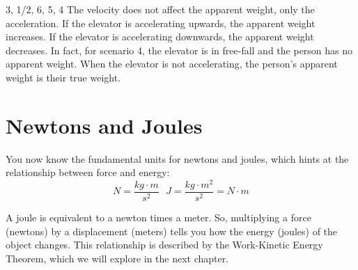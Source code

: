 \begin{Answer}[ref = elevator]
3, 1/2, 6, 5, 4
The velocity does not affect the apparent weight, only the acceleration. If the 
elevator is accelerating upwards, the apparent weight increases. If the elevator 
is accelerating downwards, the apparent weight decreases. In fact, for scenario 
4, the elevator is in free-fall and the person has no apparent weight. When the 
elevator is not accelerating, the person's apparent weight is their true weight. 
\end{Answer}


\section{Newtons and Joules}
You now know the fundamental units for newtons and joules, which hints at the 
relationship between force and energy:
$$N = \frac{kg \cdot m}{s^2} \text{     } J = \frac{kg \cdot m^2}{s^2} = N \cdot m$$

A joule is equivalent to a newton times a meter. So, multiplying a force 
(newtons) by a displacement (meters) tells you how the energy (joules) of the 
object changes. This relationship is described by the Work-Kinetic Energy Theorem, 
which we will explore in the next chapter. 
